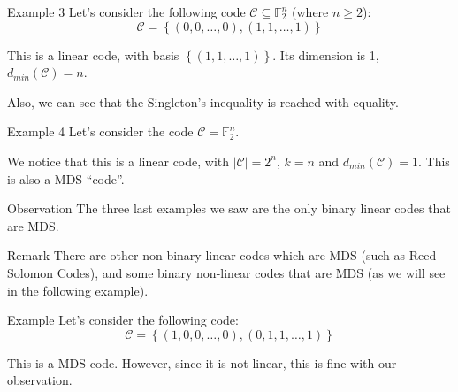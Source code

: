 \documentclass[a4paper]{article}
\begin{document}
\begin{parag}{Example 3}
    Let's consider the following code $\mathcal{C} \subseteq \mathbb{F}_2^n$ (where $n \geq 2$):
    \[\mathcal{C} = \left\{\left(0, 0, \ldots, 0\right), \left(1, 1, \ldots, 1\right)\right\}\]

    This is a linear code, with basis $\left\{\left(1, 1, \ldots, 1\right)\right\}$. Its dimension is 1, $d_{min}\left(\mathcal{C}\right) = n$.

    Also, we can see that the Singleton's inequality is reached with equality.
\end{parag}

\begin{parag}{Example 4}
    Let's consider the code $\mathcal{C} = \mathbb{F}_2^n$.

    We notice that this is a linear code, with $\left|\mathcal{C}\right| = 2^n$, $k = n$ and $d_{min}\left(\mathcal{C}\right) = 1$. This is also a MDS ``code''.
\end{parag}

\begin{parag}{Observation}
    The three last examples we saw are the only binary linear codes that are MDS.

    \begin{subparag}{Remark}
        There are other non-binary linear codes which are MDS (such as Reed-Solomon Codes), and some binary non-linear codes that are MDS (as we will see in the following example).
    \end{subparag}
\end{parag}

\begin{parag}{Example}
    Let's consider the following code:
    \[\mathcal{C} = \left\{\left(1, 0, 0, \ldots, 0\right), \left(0, 1, 1, \ldots, 1\right)\right\}\]

    This is a MDS code. However, since it is not linear, this is fine with our observation.
\end{parag}
\end{document}
